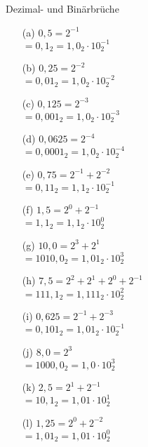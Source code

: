 \begin{exercise}{Dezimal- und Binärbrüche}
\begin{solution}
\begin{center}
\begin{minipage}{0.3\textwidth}
\begin{itemize}
\item[(a)] $0{,}5    = 2^{-1}$          \\ $= 0{,}1_2    = 1{,}0_2\cdot 10_2^{-1}$
\item[(b)] $0{,}25   = 2^{-2}$          \\ $= 0{,}01_2   = 1{,}0_2\cdot 10_2^{-2}$
\item[(c)] $0{,}125  = 2^{-3}$          \\ $= 0{,}001_2  = 1{,}0_2\cdot 10_2^{-3}$
\item[(d)] $0{,}0625 = 2^{-4}$          \\ $= 0{,}0001_2 = 1{,}0_2\cdot 10_2^{-4}$
\item[(e)] $0{,}75   = 2^{-1} + 2^{-2}$ \\ $= 0{,}11_2   = 1{,}1_2\cdot 10_2^{-1}$
\end{itemize}
\end{minipage}
\begin{minipage}{0.3\textwidth}
\begin{itemize}
\item[(f)] $1{,}5   = 2^{0} + 2^{-1}$                 \\ $= 1{,}1_2    = 1{,}1_2   \cdot 10_2^{0}$
\item[(g)] $10{,}0  = 2^{3} + 2^{1}$                  \\ $= 1010{,}0_2 = 1{,}01_2  \cdot 10_2^{3}$
\item[(h)] $7{,}5   = 2^{2} + 2^{1} + 2^{0} + 2^{-1}$ \\ $= 111{,}1_2  = 1{,}111_2 \cdot 10_2^{2}$
\item[(i)] $0{,}625 = 2^{-1} + 2^{-3}$                \\ $= 0{,}101_2  = 1{,}01_2  \cdot 10_2^{-1}$
\item[(j)] $8{,}0   = 2^{3}$                          \\ $= 1000{,}0_2 = 1{,}0     \cdot 10_2^{3}$
\end{itemize}
\end{minipage}
\begin{minipage}{0.35\textwidth}
\begin{itemize}
\item[(k)] $2{,}5   = 2^1 + 2^{-1}$          \\ $= 10{,}1_2    = 1{,}01     \cdot 10_2^{1}$ 
\item[(l)] $1{,}25  = 2^0 + 2^{-2}$          \\ $= 1{,}01_2    = 1{,}01     \cdot 10_2^{0}$

\end{itemize}
\end{minipage}
\end{center}
\end{solution}
\end{exercise}
